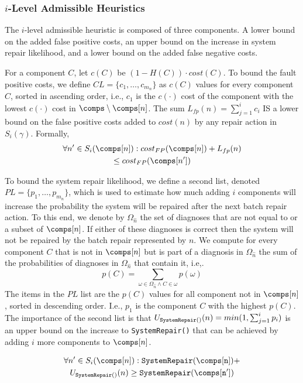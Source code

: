\documentclass[review]{elsarticle}
\newcommand\sysrep[1]{{\tt SystemRepair(#1)}}
\begin{document}
\subsubsection{$i$-Level Admissible Heuristics}

The $i$-level admissible heuristic is composed of three components. A lower bound on the added false positive costs, an upper bound on the increase in system repair likelihood, and a lower bound on the added false negative costs. 

For a component $C$, let $c(C)$ be $(1-H(C))\cdot cost(C)$. 
To bound the fault positive costs, we define $CL=\{c_1,\ldots,c_{m_n}\}$ as $c(C)$ values for every component $C$, sorted in ascending order, i.e., $c_1$ is the $c(\cdot)$ cost of the component with the lowest $c(\cdot)$ cost in $\comps\setminus\comps[n]$.  The sum $L_{fp}(n)=\sum_{j=1}^i c_i$ IS a lower bound  on the false positive costs added to $cost(n)$ by any repair action in $S_i(\gamma)$.
Formally, 
\begin{multline}
\forall n'\in S_i(\comps[n])  : cost_{FP}(\comps[n])+ L_{fp}(n) \\
\leq cost_{FP}(\comps[n'])
\label{eq:fp-bound}
\end{multline}

To bound the system repair likelihood, we define a second list, denoted $PL=\{p_1,\ldots, p_{m_n}\}$, which is used to estimate how much adding $i$ components will increase the probability the system will be repaired after the next batch repair action. To this end, we denote by $\Omega_{\hat{n}}$ the set of diagnoses that are not equal to or a subset of $\comps[n]$. If either of these diagnoses is correct then the system will not be repaired by the batch repair represented by $n$. We compute for every component $C$ that is not in $\comps[n]$ but is part of a  diagnosis in $\Omega_{\hat{n}}$ the sum of the probabilities of diagnoses in $\Omega_{\hat{n}}$ that contain it, i.e,. 
\[ p(C)=\sum_{\omega\in \Omega_{\hat{n}}\wedge C\in \omega} p(\omega) \]
The items in the $PL$ list are the $p(C)$ values for all component not in $\comps[n]$, 
sorted in descending order. I.e., $p_1$ is the component $C$ with the highest $p(C)$. 
The importance of the second list is that $U_{\sysrep{}}(n)=min(1, \sum_{j=1}^i p_i)$ is an upper bound on 
the increase to \sysrep{\comps[n]} that can be achieved by adding $i$ more components 
to $\comps[n]$. 

\begin{multline}
\forall n'\in S_i(\comps[n])  : \sysrep{\comps[n]}+\\ U_{\sysrep{}}(n) 
 \geq  \sysrep{\comps[n']}
\label{eq:sysrep-bound}
\end{multline}
\end{document}
